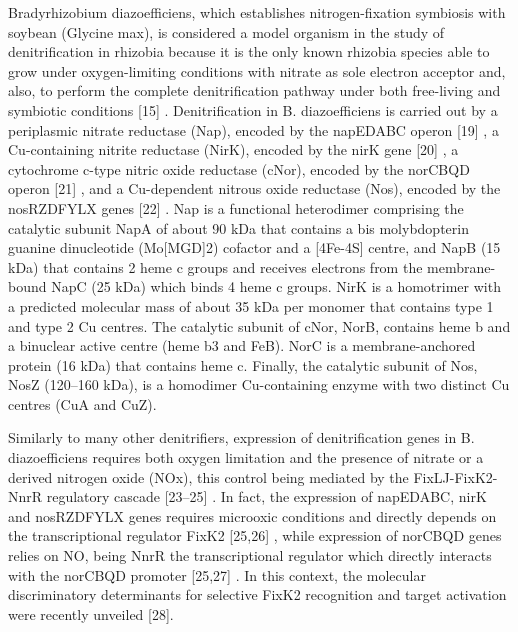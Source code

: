 \documentclass[12pt]{article}
\begin{document}
Bradyrhizobium diazoefficiens, which establishes nitrogen-fixation symbiosis with soybean
(Glycine max), is considered a model organism in the study of denitrification in
rhizobia because it is the only known rhizobia species able to grow under oxygen-limiting
conditions with nitrate as sole electron acceptor and, also, to perform the complete denitrification
pathway under both free-living and symbiotic conditions [15] \cite{bedmar2005complete}. Denitrification
in B. diazoefficiens is carried out by a periplasmic nitrate reductase (Nap), encoded by the
napEDABC operon [19] \cite{delgado2003bradyrhizobium}, a Cu-containing nitrite reductase (NirK), encoded by the nirK
gene [20] \cite{velasco2001characterization}, a cytochrome c-type nitric oxide reductase (cNor), encoded by the norCBQD
operon [21] \cite{mesa2002characterization}, and a Cu-dependent nitrous oxide reductase (Nos), encoded by the nosRZDFYLX
genes [22] \cite{velasco2004molecular}. Nap is a functional heterodimer comprising the catalytic subunit NapA of
about 90 kDa that contains a bis molybdopterin guanine dinucleotide (Mo[MGD]2) cofactor
and a [4Fe-4S] centre, and NapB (15 kDa) that contains 2 heme c groups and receives
electrons from the membrane-bound NapC (25 kDa) which binds 4 heme c groups. NirK
is a homotrimer with a predicted molecular mass of about 35 kDa per monomer that
contains type 1 and type 2 Cu centres. The catalytic subunit of cNor, NorB, contains heme b
and a binuclear active centre (heme b3 and FeB). NorC is a membrane-anchored protein
(16 kDa) that contains heme c. Finally, the catalytic subunit of Nos, NosZ (120–160 kDa), is
a homodimer Cu-containing enzyme with two distinct Cu centres (CuA and CuZ).

Similarly to many other denitrifiers, expression of denitrification genes in B. diazoefficiens
requires both oxygen limitation and the presence of nitrate or a derived nitrogen oxide
(NOx), this control being mediated by the FixLJ-FixK2-NnrR regulatory cascade [23–25] \cite{mesa2003bradyrhizobium}\cite{mesa2008comprehensive}\cite{bueno2017disparate}.
In fact, the expression of napEDABC, nirK and nosRZDFYLX genes requires microoxic
conditions and directly depends on the transcriptional regulator FixK2 [25,26] \cite{bueno2017disparate}\cite{torres2017fixk2}, while expression
of norCBQD genes relies on NO, being NnrR the transcriptional regulator which
directly interacts with the norCBQD promoter [25,27] \cite{bueno2017disparate}\cite{jimenez2019expanding}. In this context, the molecular discriminatory
determinants for selective FixK2 recognition and target activation were recently unveiled [28]\cite{cabrera2021dissection}.
\end{document}
